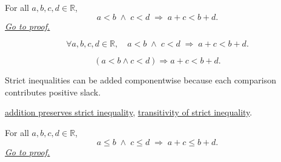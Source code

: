 
\begin{theorem}
\label{thm:ineq-add-inequalities}
For all $a, b, c, d \in \mathbb{R}$,
\[
  a < b \;\land\; c < d \;\Rightarrow\; a + c < b + d.
\]
\hyperref[prf:ineq-add-inequalities]{\textit{Go to proof.}}
\end{theorem}



\begin{remark*}
\[
  \forall a, b, c, d \in \mathbb{R},\quad
  a < b \;\land\; c < d \;\Rightarrow\; a + c < b + d.
\]
\end{remark*}

\begin{remark*}
\[
(a<b\land c<d)\Rightarrow a+c<b+d.
\]
\end{remark*}

\begin{remark*}[Interpretation]
Strict inequalities can be added componentwise because each comparison contributes positive slack.
\end{remark*}

\begin{dependencies}
\hyperref[thm:ineq-add-both-sides]{addition preserves strict inequality},
\hyperref[thm:ineq-transitivity-strict]{transitivity of strict inequality}.
\end{dependencies}


\begin{theorem}
\label{thm:ineq-nonstrict-add-inequalities}
For all $a, b, c, d \in \mathbb{R}$,
\[
  a \le b \;\land\; c \le d \;\Rightarrow\; a + c \le b + d.
\]
\hyperref[prf:ineq-nonstrict-add-inequalities]{\textit{Go to proof.}}
\end{theorem}



